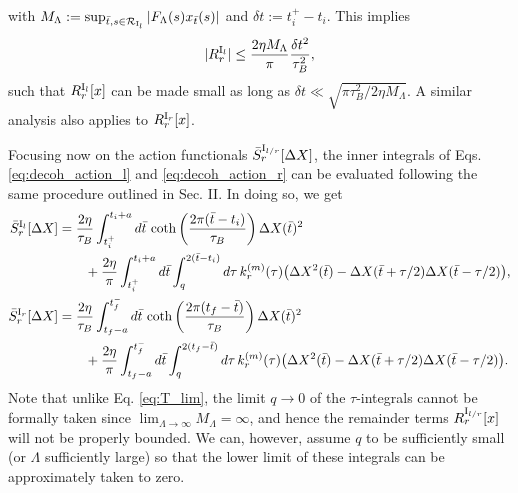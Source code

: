 \documentclass[prl,twocolumn,superscriptaddress,amsmath,amssymb]{revtex4-2}
\def\be{\begin{equation}}
\def\ee{\end{equation}}
\newcommand{\tb}{\bar{t}}
\begin{document}
with $M_{\Lambda} := \sup_{\tb,s\in\mathcal{R}_{{\rm I}_l}}|F_{\Lambda}(s)x_{\tb}(s)|$ and $\delta t := t^+_i-t_i$. This implies 
\be
    |R^{{\rm I}_l}_r| \leq \frac{2\eta M_{\Lambda}}{\pi}\frac{\delta t^2}{\tau^2_B},
\ee
such that $R^{{\rm I}_l}_r[x]$ can be made small as long as $\delta t \ll \sqrt{\pi\tau^2_B/2\eta M_{\Lambda}}$. A similar analysis also applies to $R^{{\rm I}_r}_r[x]$.

Focusing now on the action functionals $\bar{S}^{{\rm I}_{l/r}}_r[\Delta X]$, the inner integrals of Eqs. \eqref{eq:decoh_action_l} and \eqref{eq:decoh_action_r} can be evaluated following the same procedure outlined in Sec. II. In doing so, we get 
\begin{subequations}
\begin{align}
	\bar{S}^{{\rm I}_l}_r[\Delta X] &= \frac{2\eta}{\tau_B}\int^{t_i+a}_{t^+_i}d\tb\,\coth\left(\frac{2\pi(\tb-t_i)}{\tau_B}\right)\Delta X(\tb)^2 \nonumber\\
		      &\qquad + \frac{2\eta}{\pi}\int^{t_i+a}_{t^+_i}d\tb \int^{2(\tb-t_i)}_qd\tau\,k^{(m)}_r(\tau)\big(\Delta X^2(\tb) - \Delta X(\tb + \tau/2)\Delta X(\tb - \tau/2)\big), \label{eq:S_I_left}\\
	\bar{S}^{{\rm I}_r}_r[\Delta X] &= \frac{2\eta}{\tau_B}\int^{t^-_f}_{t_f-a}d\tb\,\coth\left(\frac{2\pi(t_f-\tb)}{\tau_B}\right)\Delta X(\tb)^2 \nonumber\\
		      &\qquad + \frac{2\eta}{\pi}\int^{t^-_f}_{t_f-a}d\tb \int^{2(t_f-\tb)}_qd\tau\,k^{(m)}_r(\tau)\big(\Delta X^2(\tb) - \Delta X(\tb + \tau/2)\Delta X(\tb - \tau/2)\big). \label{eq:S_I_right}
\end{align}
\end{subequations}
Note that unlike Eq. \eqref{eq:T_lim}, the limit $q\rightarrow0$ of the $\tau$-integrals cannot be formally taken since $\lim_{\Lambda\rightarrow\infty}M_{\Lambda}=\infty$, and hence the remainder terms $R^{{\rm I}_{l/r}}_r[x]$ will not be properly bounded. We can, however, assume $q$ to be sufficiently small (or $\Lambda$ sufficiently large) so that the lower limit of these integrals can be approximately taken to zero. 
\end{document}
